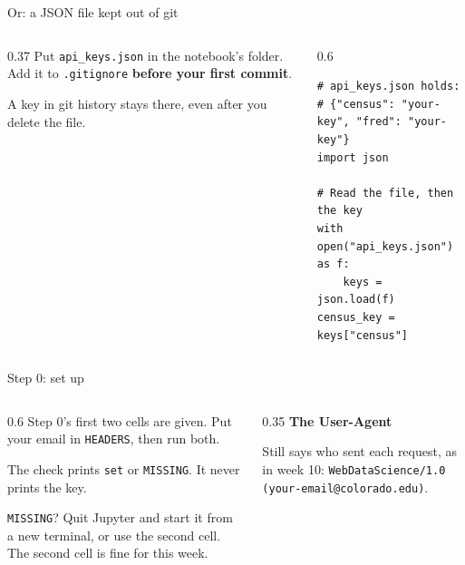\documentclass[9pt,aspectratio=169]{beamer}
\begin{document}
\begin{frame}[fragile]{Or: a JSON file kept out of git}
    \begin{columns}[T]
        \begin{column}{0.37\textwidth}
            Put \texttt{api\_keys.json} in the notebook's folder. Add it to \texttt{.gitignore} \textbf{before your first commit}.

            \medskip
            A key in git history stays there, even after you delete the file.
        \end{column}
        \begin{column}{0.6\textwidth}
\begin{lstlisting}
# api_keys.json holds:
# {"census": "your-key", "fred": "your-key"}
import json

# Read the file, then the key
with open("api_keys.json") as f:
    keys = json.load(f)
census_key = keys["census"]
\end{lstlisting}
        \end{column}
    \end{columns}
\end{frame}

\begin{frame}{Step 0: set up}
    \begin{columns}[T]
        \begin{column}{0.6\textwidth}
            Step 0's first two cells are given. Put your email in \texttt{HEADERS}, then run both.

            \medskip
            The check prints \texttt{set} or \texttt{MISSING}. It never prints the key.

            \medskip
            \texttt{MISSING}? Quit Jupyter and start it from a new terminal, or use the second cell. The second cell is fine for this week.
        \end{column}
        \begin{column}{0.35\textwidth}
            \textbf{The User-Agent}\\[2pt]
            {\footnotesize Still says who sent each request, as in week 10: \texttt{WebDataScience/1.0 (your-email@colorado.edu)}.\par}
        \end{column}
    \end{columns}
\end{frame}
\end{document}

